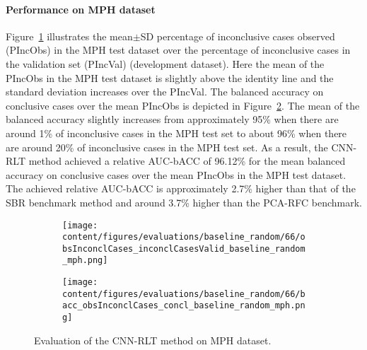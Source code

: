 
\paragraph{Performance on MPH dataset}

Figure~\ref{fig:obsInconclCases_inconclCasesValid_baseline_random_mph} illustrates
the mean$\pm$SD percentage of inconclusive cases observed (PIncObs) in the MPH test dataset 
over the percentage of inconclusive cases in the validation set (PIncVal) (development dataset).
Here the mean of the PIncObs in the MPH test dataset is slightly above the identity line 
and the standard deviation increases over the PIncVal.
The balanced accuracy on conclusive cases over the mean PIncObs is depicted 
in Figure~\ref{fig:bacc_obsInconclCases_concl_baseline_random_mph}.
The mean of the balanced accuracy slightly increases from approximately 95\% 
when there are around 1\% of inconclusive cases in the MPH test set to about 96\% 
when there are around 20\% of inconclusive cases in the MPH test set.
As a result, the CNN-RLT method achieved a relative AUC-bACC of 96.12\% for the mean balanced accuracy on conclusive cases 
over the mean PIncObs in the MPH test dataset.
The achieved relative AUC-bACC is approximately 2.7\% higher than that of the SBR benchmark method 
and around 3.7\% higher than the PCA-RFC benchmark.


\begin{figure}[ht]
  \begin{subfigure}{0.49\textwidth}
    \centering
    \texttt{[image: content/figures/evaluations/baseline\_random/66/obsInconclCases\_inconclCasesValid\_baseline\_random\_mph.png]}
    \label{fig:obsInconclCases_inconclCasesValid_baseline_random_mph}
  \end{subfigure}
  \hfill
  \begin{subfigure}{0.49\textwidth}
    \centering
    \texttt{[image: content/figures/evaluations/baseline\_random/66/bacc\_obsInconclCases\_concl\_baseline\_random\_mph.png]}
    \label{fig:bacc_obsInconclCases_concl_baseline_random_mph}
  \end{subfigure}
  \caption{Evaluation of the CNN-RLT method on MPH dataset.}
  \label{fig:perf_eval_rlt_mph}
\end{figure}


